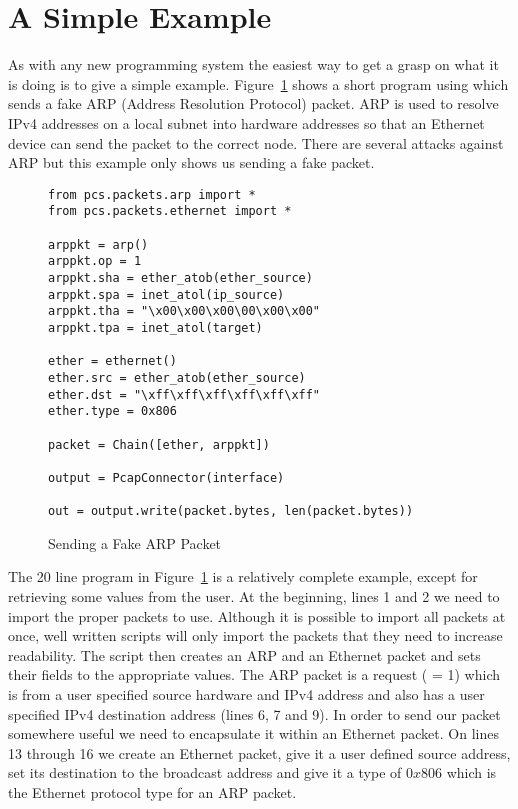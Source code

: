 \documentclass[11pt]{article}
\begin{document}
\section{A Simple Example}
\label{sec:a-simple-example}

As with any new programming system the easiest way to get a grasp on
what it is doing is to give a simple example.
Figure~\ref{fig:sending-a-fake-arp-packet} shows a short program using
 which sends a fake ARP (Address Resolution Protocol)
packet.  ARP is used to resolve IPv4 addresses on a local subnet into
hardware addresses so that an Ethernet device can send the packet to
the correct node.  There are several attacks against ARP but this
example only shows us sending a fake packet.

\begin{figure}
  \centering
\begin{verbatim}
from pcs.packets.arp import *
from pcs.packets.ethernet import *

arppkt = arp()
arppkt.op = 1
arppkt.sha = ether_atob(ether_source)
arppkt.spa = inet_atol(ip_source)
arppkt.tha = "\x00\x00\x00\00\x00\x00"
arppkt.tpa = inet_atol(target)

ether = ethernet()
ether.src = ether_atob(ether_source)
ether.dst = "\xff\xff\xff\xff\xff\xff"
ether.type = 0x806

packet = Chain([ether, arppkt])

output = PcapConnector(interface)

out = output.write(packet.bytes, len(packet.bytes))
\end{verbatim}
  \caption{Sending a Fake ARP Packet}
  \label{fig:sending-a-fake-arp-packet}
\end{figure}

The 20 line program in Figure~\ref{fig:sending-a-fake-arp-packet} is a
relatively complete example, except for retrieving some values from
the user.  At the beginning, lines 1 and 2 we need to import the
proper packets to use.  Although it is possible to import all packets
at once, well written scripts will only import the packets that they
need to increase readability.  The script then creates an ARP and an
Ethernet packet and sets their fields to the appropriate values.  The
ARP packet is a request ( = 1) which is from a user
specified source hardware and IPv4 address and also has a user
specified IPv4 destination address (lines 6, 7 and 9).  In order to
send our packet somewhere useful we need to encapsulate it within an
Ethernet packet.  On lines 13 through 16 we create an Ethernet packet,
give it a user defined source address, set its destination to the
broadcast address and give it a type of $0x806$ which is the Ethernet
protocol type for an ARP packet.
\end{document}
